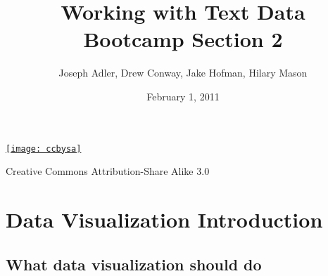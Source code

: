 \documentclass[xcolor=dvipsnames, 9pt]{beamer}
\title{Working with Text Data\\Bootcamp Section 2}
\author{Joseph Adler, Drew Conway, Jake Hofman, Hilary Mason}
\date{February 1, 2011}
\begin{document}
 

\begin{frame}[plain]
  \titlepage 
  
  \tiny
  \href{http://creativecommons.org/licenses/by-sa/3.0/us/}{\texttt{[image: ccbysa]}}

  Creative Commons Attribution-Share Alike 3.0
\end{frame}

\section{Data Visualization Introduction} %
\label{sec:visualization}

\subsection{What data visualization should do} %
\label{sub:what_data_visualization_should_do}
\end{document}
